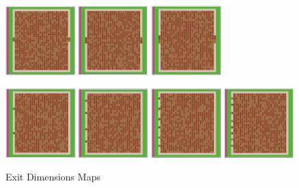 \documentclass[12pt,letterpaper]{article}
\begin{document}
\begin{figure}[ht]
\begin{minipage}[b]{.75\linewidth}
    \includegraphics[width=0.24\textwidth]{./figures/exit_dims_4_b.png}
    \includegraphics[width=0.24\textwidth]{./figures/exit_dims_6_b.png}
    \includegraphics[width=0.24\textwidth]{./figures/exit_dims_8_b.png}
  \end{minipage}
  \begin{minipage}[b]{.75\linewidth}
    \includegraphics[width=0.24\textwidth]{./figures/exit_dims_2_c.png}
    \includegraphics[width=0.24\textwidth]{./figures/exit_dims_4_c.png}
    \includegraphics[width=0.24\textwidth]{./figures/exit_dims_6_c.png}
    \includegraphics[width=0.24\textwidth]{./figures/exit_dims_8_c.png}
  \end{minipage}

  \caption{Exit Dimensions Maps}
\end{figure}
\end{document}
